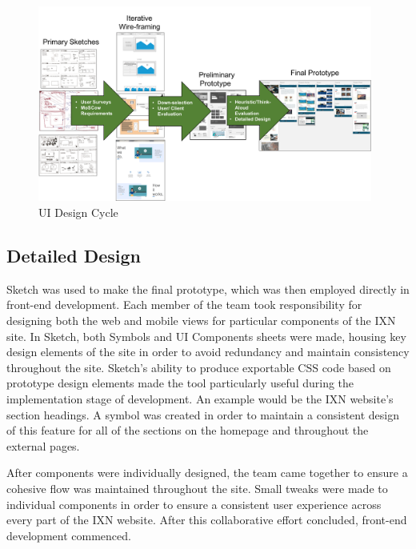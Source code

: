 \documentclass[fontsize=10pt]{extarticle}
\numberwithin{figure}{section} %
\begin{document}
\begin{figure}[H]
\centering
\includegraphics[trim = 0 0 0 0, clip, width=0.98\textwidth]{UIDesign.png}
\caption{UI Design Cycle}
\label{UIDesign}
\end{figure}

\hypertarget{detailed-design}{%
\subsection{Detailed Design}\label{detailed-design}}

Sketch was used to make the final prototype, which was then employed
directly in front-end development. Each member of the team took
responsibility for designing both the web and mobile views for
particular components of the IXN site. In Sketch, both Symbols and UI
Components sheets were made, housing key design elements of the site in
order to avoid redundancy and maintain consistency throughout the site.
Sketch's ability to produce exportable CSS code based on prototype
design elements made the tool particularly useful during the
implementation stage of development. An example would be the IXN
website's section headings. A symbol was created in order to maintain a
consistent design of this feature for all of the sections on the
homepage and throughout the external pages.

After components were individually designed, the team came together to
ensure a cohesive flow was maintained throughout the site. Small tweaks
were made to individual components in order to ensure a consistent user
experience across every part of the IXN website. After this
collaborative effort concluded, front-end development commenced.
\end{document}
